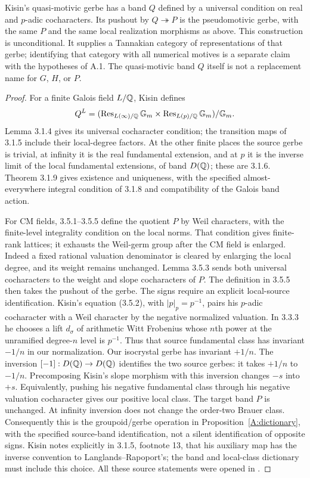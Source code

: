 \begin{proposition}
\label{A:kisin}
Kisin's quasi-motivic gerbe has a band $Q$ defined by a universal
condition on real and $p$-adic cocharacters. Its pushout by
$Q\twoheadrightarrow P$ is the pseudomotivic gerbe, with the
same $P$ and the same local realization morphisms as above.
This construction is unconditional. It supplies a Tannakian
category of representations of that gerbe; identifying that
category with all numerical motives is a separate claim with the
hypotheses of A.1. The quasi-motivic band $Q$ itself is not a
replacement name for $G$, $H$, or $P$.
\end{proposition}
\begin{proof}
For a finite Galois field $L/\mathbb Q$, Kisin defines
\[
 Q^L=(\operatorname{Res}_{L(\infty)/\mathbb Q}{\mathbb G_m}
       \times\operatorname{Res}_{L(p)/\mathbb Q}{\mathbb G_m})/{\mathbb G_m}.
\]
Lemma 3.1.4 gives its universal cocharacter condition; the
transition maps of 3.1.5 include their local-degree factors.
At the other finite places the source gerbe is trivial, at
infinity it is the real fundamental extension, and at $p$ it is
the inverse limit of the local fundamental extensions, of band
$D(\mathbb Q)$; these are 3.1.6. Theorem 3.1.9 gives existence and
uniqueness, with the specified almost-everywhere integral
condition of 3.1.8 and compatibility of the Galois band action.

For CM fields, 3.5.1--3.5.5 define the quotient $P$ by Weil
characters, with the finite-level integrality condition on the
local norms. That condition gives finite-rank lattices; it
exhausts the Weil-germ group after the CM field is enlarged.
Indeed a fixed rational valuation denominator is cleared by
enlarging the local degree, and its weight remains unchanged.
Lemma 3.5.3 sends both universal cocharacters to the weight and
slope cocharacters of $P$. The definition in 3.5.5 then takes
the pushout of the gerbe. The signs require an explicit
local-source identification. Kisin's equation (3.5.2), with
$|p|_p=p^{-1}$, pairs his $p$-adic cocharacter with a Weil
character by the negative normalized valuation. In 3.3.3 he
chooses a lift $d_\sigma$ of arithmetic Witt Frobenius whose
$n$th power at the unramified degree-$n$ level is $p^{-1}$.
Thus that source fundamental class has invariant $-1/n$ in
our normalization. Our isocrystal gerbe has invariant $+1/n$.
The inversion $[-1]:D(\mathbb Q)\to D(\mathbb Q)$ identifies the two source
gerbes: it takes $+1/n$ to $-1/n$. Precomposing Kisin's slope
morphism with this inversion changes $-s$ into $+s$.
Equivalently, pushing his negative fundamental class through
his negative valuation cocharacter gives our positive local
class. The target band $P$ is unchanged. At infinity inversion
does not change the order-two Brauer class. Consequently this
is the groupoid/gerbe operation in
Proposition~\ref{A:dictionary}, with the specified source-band
identification, not a silent identification of opposite signs.
Kisin notes explicitly in 3.1.5, footnote 13, that his auxiliary
map has the inverse convention to Langlands--Rapoport's; the
band and local-class dictionary must include this choice.
All these source statements were opened in
\citet[\S\S3.1 and 3.5]{AKisin2017}.


\end{proof}
